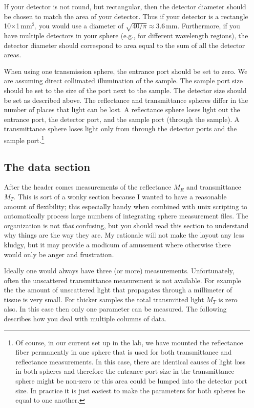 \documentclass{article}
\begin{document}
If your detector is not round, but rectangular, then the detector diameter should 
be chosen to match the area of your detector.  Thus if your detector is a rectangle
10$\times$1\,mm$^2$, you would use a diameter of $\sqrt{40/\pi}\approx3.6$\,mm.
Furthermore, if you have multiple detectors in your sphere (e.g., for different wavelength
regions), the detector diameter should correspond to area equal to the sum of all
the detector areas.  

When using one transmission sphere, the entrance port should be set to zero.  We are
assuming direct collimated illumination of the sample.  The sample port size should
be set to the size of the port next to the sample.  The detector size should be set
as described above.  The reflectance and transmittance spheres differ in the number
of places that light can be lost.  A reflectance sphere loses light out the entrance
port, the detector port, and the sample port (through the sample).  A transmittance
sphere loses light only from through the detector ports and the sample port.\footnote[1]{Of
course, in our current set up in the lab, we have mounted the reflectance fiber 
permanently in one sphere that is used for both transmittance and reflectance
measurements.  In this case, there are identical causes of light loss in both
spheres and therefore the entrance port size in the transmittance sphere might
be non-zero or this area could be lumped into the detector port size.  In practice
it is just easiest to make the parameters for both spheres be equal to one another.}


\subsection{The data section}

After the header comes measurements of the reflectance $M_R$ and transmittance $M_T$.  
This is sort of a wonky section because I wanted to have a reasonable amount of flexibility;
this especially handy when combined with unix scripting to automatically process large numbers 
of integrating sphere measurement files.  The organization is not \textit{that} confusing, but 
you should read this section to understand why things are the way they are.  My rationale will 
not make the layout any less kludgy, but it may provide a modicum of
amusement where otherwise there would only be anger and frustration.

Ideally one
would always have three (or more) measurements.  Unfortunately, often the unscattered
transmittance measurement is not available.  For example the the amount of unscattered
light that propagates through a millimeter of tissue is very small.  For thicker samples
the total transmitted light 
$M_T$ is zero also. In this case then only one parameter can be measured.  The following
describes how you deal with multiple columns of data.
\end{document}
